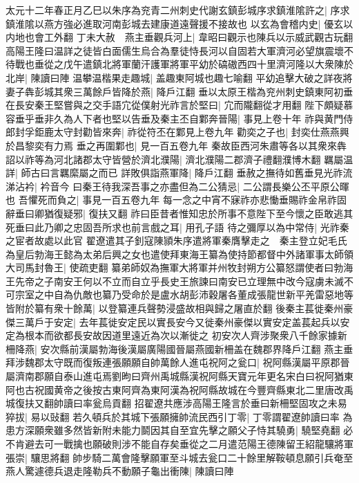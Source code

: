 太元十二年春正月乙巳以朱序為兖青二州刺史代謝玄鎮彭城序求鎮淮隂許之|{
	序求鎮淮隂以燕方強必進取河南彭城去建康道遠聲援不接故也}
以玄為會稽内史|{
	優玄以内地也會工外翻}
丁未大赦　燕主垂觀兵河上|{
	韋昭曰觀示也陳兵以示威武觀古玩翻}
高陽王隆曰温詳之徒皆白面儒生烏合為羣徒恃長河以自固若大軍濟河必望旗震壞不待戰也垂從之戊午遣鎮北將軍蘭汗護軍將軍平幼於碻磝西四十里濟河隆以大衆陳於北岸|{
	陳讀曰陣}
温攀温楷果走趣城|{
	盖趣東阿城也趣七喻翻}
平幼追擊大破之詳夜將妻子犇彭城其衆三萬餘戶皆降於燕|{
	降戶江翻}
垂以太原王楷為兖州刺史鎮東阿初垂在長安秦王堅嘗與之交手語宂從僕射光祚言於堅曰|{
	宂而隴翻從才用翻}
陛下頗疑慕容垂乎垂非久為人下者也堅以告垂及秦主丕自鄴奔晉陽|{
	事見上卷十年}
祚與黄門侍郎封孚鉅鹿太守封勸皆來奔|{
	祚從符丕在鄴見上卷九年}
勸奕之子也|{
	封奕仕燕燕興於昌黎奕有力焉}
垂之再圍鄴也|{
	見一百五卷九年}
秦故臣西河朱肅等各以其衆來犇詔以祚等為河北諸郡太守皆營於濟北濮陽|{
	濟北濮陽二郡濟子禮翻濮博木翻}
羈屬温詳|{
	師古曰言羈縻屬之而已}
詳敗俱詣燕軍降|{
	降戶江翻}
垂赦之撫待如舊垂見光祚流涕沾衿|{
	衿音今}
曰秦王待我深吾事之亦盡但為二公猜忌|{
	二公謂長樂公丕平原公暉也}
吾懼死而負之|{
	事見一百五卷九年}
每一念之中宵不寐祚亦悲慟垂賜祚金帛祚固辭垂曰卿猶復疑邪|{
	復扶又翻}
祚曰臣昔者惟知忠於所事不意陛下至今懷之臣敢逃其死垂曰此乃卿之忠固吾所求也前言戲之耳|{
	用孔子語}
待之彌厚以為中常侍|{
	光祚秦之宦者故處以此官}
翟遼遣其子釗寇陳頴朱序遣將軍秦膺擊走之　秦主登立妃毛氏為皇后勃海王懿為太弟后興之女也遣使拜東海王纂為使持節都督中外諸軍事太師領大司馬封魯王|{
	使疏吏翻}
纂弟師奴為撫軍大將軍并州牧封朔方公纂怒謂使者曰勃海王先帝之子南安王何以不立而自立乎長史王旅諫曰南安已立理無中改今寇虜未滅不可宗室之中自為仇敵也纂乃受命於是盧水胡彭沛穀屠各董成張龍世新平羌雷惡地等皆附於纂有衆十餘萬|{
	以登纂連兵聲勢浸盛故相與歸之屠直於翻}
後秦主萇徙秦州豪傑三萬戶于安定|{
	去年萇徙安定民以實長安今又徙秦州豪傑以實安定盖萇起兵以安定為根本而欲都長安故因道里遠近為次以漸徙之}
初安次人齊涉聚衆八千餘家據新柵降燕|{
	安次縣前漢屬勃海後漢屬廣陽國晉屬燕國新柵盖在魏郡界降戶江翻}
燕主垂拜涉魏郡太守既而復叛連張願願自帥萬餘人進屯祝阿之瓮口|{
	祝阿縣漢屬平原郡晉屬濟南郡願自泰山進屯焉劉昫曰齊州禹城縣漢祝阿縣天寶元年更名宋白曰祝阿猶東阿也古祝國黄帝之後按古東阿齊為東阿漢為祝阿縣故城在今豐齊縣東北二里唐改禹城復扶又翻帥讀曰率瓮烏貢翻}
招翟遼共應涉高陽王隆言於垂曰新柵堅固攻之未易猝拔|{
	易以䜴翻}
若久頓兵於其城下張願擁帥流民西引丁零|{
	丁零謂翟遼帥讀曰率}
為患方深願衆雖多然皆新附未能力鬬因其自至宜先擊之願父子恃其驍勇|{
	驍堅堯翻}
必不肯避去可一戰擒也願破則涉不能自存矣垂從之二月遣范陽王德陳留王紹龍驤將軍張崇|{
	驤思將翻}
帥步騎二萬會隆擊願軍至斗城去瓮口二十餘里解鞍頓息願引兵奄至燕人驚遽德兵退走隆勒兵不動願子龜出衝陳|{
	陳讀曰陣}
